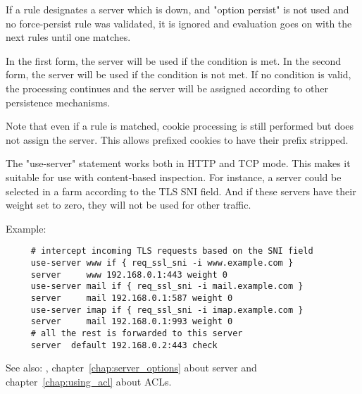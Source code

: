   If a rule designates a server which is down, and "option persist" is not used
  and no force-persist rule was validated, it is ignored and evaluation goes on
  with the next rules until one matches.

  In the first form, the server will be used if the condition is met. In the
  second form, the server will be used if the condition is not met. If no
  condition is valid, the processing continues and the server will be assigned
  according to other persistence mechanisms.

  Note that even if a rule is matched, cookie processing is still performed but
  does not assign the server. This allows prefixed cookies to have their prefix
  stripped.

  The "use-server" statement works both in HTTP and TCP mode. This makes it
  suitable for use with content-based inspection. For instance, a server could
  be selected in a farm according to the TLS SNI field. And if these servers
  have their weight set to zero, they will not be used for other traffic.

  Example:
  \begin{verbatim}
     # intercept incoming TLS requests based on the SNI field
     use-server www if { req_ssl_sni -i www.example.com }
     server     www 192.168.0.1:443 weight 0
     use-server mail if { req_ssl_sni -i mail.example.com }
     server     mail 192.168.0.1:587 weight 0
     use-server imap if { req_ssl_sni -i imap.example.com }
     server     mail 192.168.0.1:993 weight 0
     # all the rest is forwarded to this server
     server  default 192.168.0.2:443 check
  \end{verbatim}


See also: , chapter~\ref{chap:server_options} about server and chapter~\ref{chap:using_acl} about ACLs.
